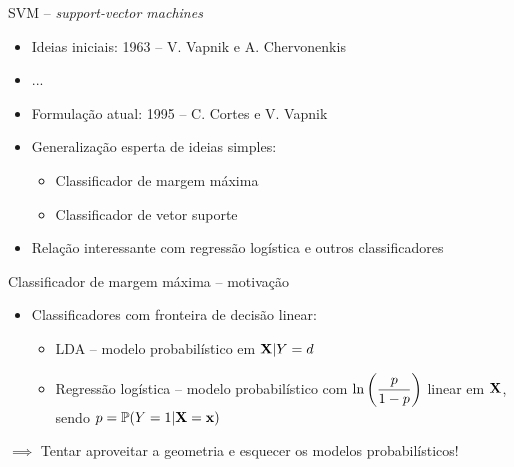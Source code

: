 \setcounter{framenumber}{0}
\date{SVM}        %


\begin{frame}{SVM -- \textit{support-vector machines}}
    \begin{itemize}
        \item Ideias iniciais: 1963 -- V. Vapnik e A. Chervonenkis
        
        \pause
        
        \item ...
        
        \pause
        
        \item Formulação atual: 1995 -- C. Cortes e V. Vapnik
        
        \pause
        
        \item Generalização esperta de ideias simples:
        \begin{itemize}
            \item Classificador de margem máxima
            
            \item Classificador de vetor suporte
        \end{itemize}
        
        \pause
        
        \item Relação interessante com regressão logística e outros classificadores
    \end{itemize}
\end{frame}



\begin{frame}{Classificador de margem máxima -- motivação}
    \begin{itemize}
        \item Classificadores com fronteira de decisão linear:
        
        \pause
        
        \begin{itemize}
            \item LDA -- modelo probabilístico em ${\bf X} | Y = d$
            
            \pause
            
            \item Regressão logística -- modelo probabilístico com $\displaystyle \ln\left(\frac{p}{1 - p}\right)$ linear em ${\bf X}$, sendo $p = \mathbb{P}(Y = 1 | {\bf X} = {\bf x})$
        \end{itemize}
    \end{itemize}
    
    \pause
    
    \begin{center}
        $\implies$ Tentar aproveitar a geometria e esquecer os modelos probabilísticos!
    \end{center}
\end{frame}

